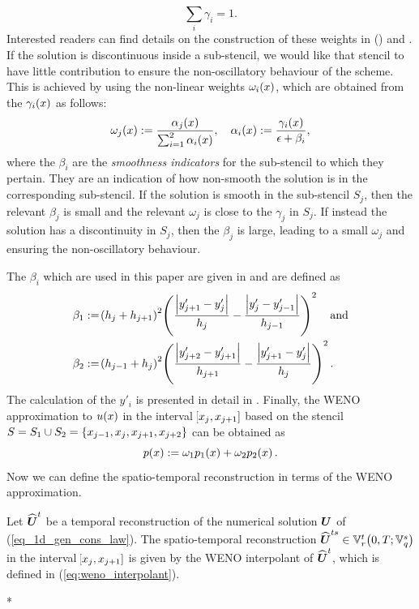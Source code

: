 \documentclass[final]{amsart}
\renewcommand{\vect}[1]{\geovec{#1}}
\renewcommand{\vec}[1]{\geovec{#1}}
\numberwithin{equation}{section}
\begin{document}
\begin{equation}
\sum_i \gamma_i = 1.
\end{equation}
Interested readers can find details on the construction of these weights in (\cite{carlini2005weighted}) and \cite{liu2009positivity}.  If the solution is discontinuous inside a sub-stencil, we would like that stencil to have little contribution to ensure the non-oscillatory behaviour of the scheme.  This is achieved by using the non-linear weights $\omega_i\!\left({x}\right)$, which are obtained from the $\gamma_i\!\left({x}\right)$ as follows:
\begin{equation}
\omega_j\!\left({x}\right):=\frac{\alpha_j\!\left({x}\right)}{\sum_{i=1}^2\alpha_i\!\left({x}\right)},\quad \alpha_i\!\left({x}\right):=\frac{\gamma_i\!\left({x}\right)}{\epsilon +\beta_i},
\end{equation}
where the $\beta_i$ are the \textit{smoothness indicators} for the sub-stencil to which they pertain.  They are an indication of how non-smooth the solution is in the corresponding sub-stencil.  If the solution is smooth in the sub-stencil $S_j$, then the relevant $\beta_j$ is small and the relevant $\omega_j$ is close to the $\gamma_j$ in $S_j$. If instead the solution has a discontinuity in $S_j$, then the $\beta_j$ is large, leading to a small $\omega_j$ and ensuring the non-oscillatory behaviour.

The $\beta_i$ which are used in this paper are given in \cite{janett2019novel} and are defined as
\begin{equation}
\begin{aligned}
\beta_1&:= \!\left({h_j +h_{j+1}}\right)^2\!\left({\frac{\left|y'_{j+1}-y'_j\right|}{h_j}  - \frac{\left|y'_{j}-y'_{j-1}\right|}{h_{j-1}}}\right)^2\quad \text{and}\\
\beta_2&:= \!\left({h_{j-1}+h_{j}}\right)^2\!\left({\frac{\left|y'_{j+2}-y'_{j+1}\right|}{h_{j+1}}  - \frac{\left|y'_{j+1}-y'_{j}\right|}{h_{j}}}\right)^2.
\end{aligned}
\end{equation}
The calculation of the $y'_i$ is presented in detail in \cite[\S3.3.2]{janett2019novel}.  Finally, the WENO approximation to $u\!\left({x}\right)$ in the interval $\!\left[{x_j, x_{j+1}}\right]$ based on the stencil $S=S_1\cup S_2=\left\lbrace x_{j-1}, x_j, x_{j+1}, x_{j+2}\right\rbrace$ can be obtained as
\begin{equation}\label{eq:weno_interpolant}
p\!\left({x}\right) := \omega_1p_1\!\left({x}\right) + \omega_2p_2\!\left({x}\right).
\end{equation}
   Now we can define the spatio-temporal reconstruction in terms of the WENO approximation.


\begin{Defn}\label{defn_spatio-temporal reconstruction}
	Let $ \widehat{\vec{U}}^t$ be a temporal reconstruction of the numerical solution $\vect{U}$ of (\ref{eq_1d_gen_cons_law}).  The spatio-temporal reconstruction $\widehat{\vec{U}}^{ts}\in\mathbb{V}^t_r\qp{0,T; \mathbb{V}^s_q}$ 
	in the interval $\!\left[{x_j, x_{j+1}}\right]$ is given by the WENO interpolant of $\widehat{\vec{U}}^t$, which is defined in (\ref{eq:weno_interpolant}).
\end{Defn}
\/*
\end{document}
